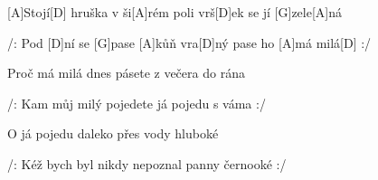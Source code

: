 
[A]Stojí[D] hruška v ši[A]rém poli
vrš[D]ek se jí [G]zele[A]ná

/: Pod [D]ní se [G]pase [A]kůň vra[D]ný
pase ho [A]má milá[D] :/

Proč má milá dnes pásete
z večera do rána

/: Kam můj milý pojedete
já pojedu s váma :/

O já pojedu daleko
přes vody hluboké

/: Kéž bych byl nikdy nepoznal
panny černooké :/


